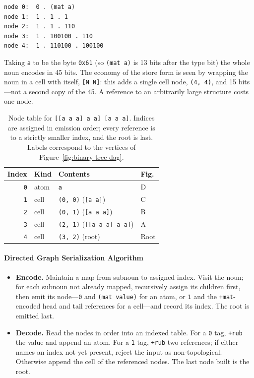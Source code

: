 \documentclass[twoside]{article}
\begin{document}
\begin{lstlisting}[style=listingblock]
node 0:  0 . (mat a)
node 1:  1 . 1 . 1
node 2:  1 . 1 . 110
node 3:  1 . 100100 . 110
node 4:  1 . 110100 . 100100
\end{lstlisting}

\noindent
Taking \texttt{a} to be the byte \texttt{0x61} (so \texttt{(mat a)} is 13 bits after the type bit) the whole noun encodes in 45 bits.  The economy of the store form is seen by wrapping the noun in a cell with itself, \texttt{[N N]}:  this adds a single cell node, \texttt{(4,\,4)}, and 15 bits---not a second copy of the 45.  A reference to an arbitrarily large structure costs one node.


\begin{table}[t]
\centering
\caption{Node table for \texttt{[[a a a] a a] [a a a]}.  Indices are assigned in emission order; every reference is to a strictly smaller index, and the root is last.  Labels correspond to the vertices of Figure~\ref{fig:binary-tree-dag}.}
\label{tab:bulk-nodes}
\begin{tabular}{ r l l l }
  \hline \hline
  \textbf{Index} & \textbf{Kind} & \textbf{Contents} & \textbf{Fig.} \\
  \hline
  \texttt{0} & atom & \texttt{a}                    & D \\
  \texttt{1} & cell & \texttt{(0,\,0)} \quad(\texttt{[a a]})       & C \\
  \texttt{2} & cell & \texttt{(0,\,1)} \quad(\texttt{[a a a]})     & B \\
  \texttt{3} & cell & \texttt{(2,\,1)} \quad(\texttt{[[a a a] a a]}) & A \\
  \texttt{4} & cell & \texttt{(3,\,2)} \quad(\textrm{root})        & Root \\
  \hline
\end{tabular}
\end{table}

\paragraph*{Directed Graph Serialization Algorithm}
\begin{itemize}
\item  \textbf{Encode.}  Maintain a map from subnoun to assigned index.  Visit the noun; for each subnoun not already mapped, recursively assign its children first, then emit its node---\texttt{0} and \texttt{(mat value)} for an atom, or \texttt{1} and the \texttt{+mat}-encoded head and tail references for a cell---and record its index.  The root is emitted last.
\item  \textbf{Decode.}  Read the nodes in order into an indexed table.  For a \texttt{0} tag, \texttt{+rub} the value and append an atom.  For a \texttt{1} tag, \texttt{+rub} two references; if either names an index not yet present, reject the input as non-topological.  Otherwise append the cell of the referenced nodes.  The last node built is the root.
\end{itemize}
\end{document}
